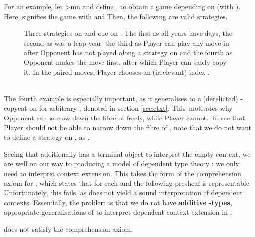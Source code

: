 \documentclass[runningheads,a4paper]{llncs}
\newcommand{\DGame}{\mathbf{DGame}}
\renewcommand{\emph}[1]{\textbf{#1}}
\begin{document}
For an example, let >mn and define ,  to obtain a game depending on  (with ). Here,  signifies the  game with  and   Then, the following are valid strategies.
\begin{figure}
\centering\resizebox{\linewidth}{!}{
}\vspace{-5pt}
\caption{Three strategies on  and one on . The first as all years have  days, the second as  was a leap year, the third as Player can play any move in  after Opponent has not played along a strategy on  and the fourth as Opponent makes the move  first, after which Player can safely copy it. In the paired moves, Player chooses an (irrelevant)  index .}\vspace{-17pt}
\end{figure}\;\\
 The fourth example is especially important, as it generalises to a (derelicted) -copycat on  for arbitrary , denoted  in section \ref{sec:ctxt}. This~motivates why Opponent can narrow down the fibre of  freely, while Player cannot. To see that Player should not be able to narrow down the fibre of , note that we do not want  to define a strategy on , as .


Seeing that  additionally has a terminal object  to interpret the empty context, we are well on our way to producing a  model of dependent type theory \cite{vakar2015syntax}: we only need to interpret context extension. This takes the form of the comprehension axiom for , which states that for each  and  the following presheaf is representable\vspace{-2pt}  
Unfortunately, this fails, as  does not yield a sound interpretation of dependent contexts. Essentially, the problem is that we do not have \emph{additive -types}, appropriate generalisations  of  to interpret dependent context extension in .
\begin{theorem} does not satisfy the comprehension axiom.
\end{theorem}
\end{document}
